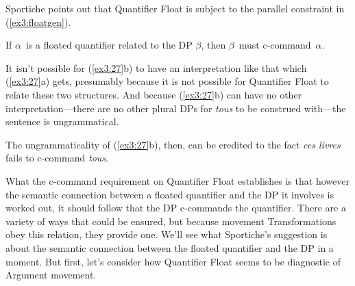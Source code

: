 Sportiche points out that Quantifier Float is subject to the parallel constraint in (\ref{ex3:floatgen}). 
\begin{exe}
\ex \label{ex3:floatgen} If $\alpha$\ is a floated quantifier related to the DP $\beta$, then $\beta$\ must c-command~$\alpha$.
\end{exe}
It isn't possible for (\ref{ex3:27}b) to have an interpretation like that which (\ref{ex3:27}a) gets, presumably because it is not possible for Quantifier Float to relate these two structures. And because (\ref{ex3:27}b) can have no other interpretation---there are no other plural DPs for \emph{tous} to be construed with---the sentence is ungrammatical.
\begin{exe}
	\ex \label{ex3:27} 
	\begin{xlist}
	\end{xlist}
\end{exe}
The ungrammaticality of (\ref{ex3:27}b), then, can be credited to the fact \emph{ces livres} fails to c-command \emph{tous}.

What the c-command requirement on Quantifier Float establishes is that however the semantic connection between a floated quantifier and the DP it involves is worked out, it should follow that the DP c-commands the quantifier. There are a variety of ways that could be ensured, but because movement Transformations obey this relation, they provide one. We'll see what Sportiche's suggestion is about the semantic connection between the floated quantifier and the DP in a moment. But first, let's consider how Quantifier Float seems to be diagnostic of Argument movement.

